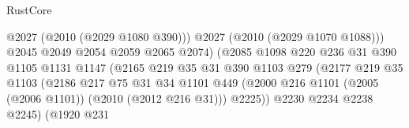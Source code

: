 \begin{lexlean}{RustCore}
\begin{coremodule}
                                                @2027
                                                (@2010 (@2029 @1080 @390)))
                                              @2027
                                              (@2010 (@2029 @1070 @1088)))
                                            @2045
                                            @2049
                                            @2054
                                            @2059
                                            @2065
                                            @2074)
                                          (@2085
                                            @1098
                                            @220
                                            @236
                                            @31
                                            @390
                                            @1105
                                            @1131
                                            @1147
                                            (@2165
                                              @219
                                              @35
                                              @31
                                              @390
                                              @1103
                                              @279
                                              (@2177
                                                @219
                                                @35
                                                @1103
                                                (@2186
                                                  @217
                                                  @75
                                                  @31
                                                  @34
                                                  @1101
                                                  @449
                                                  (@2000
                                                    @216
                                                    @1101
                                                    (@2005 (@2006 @1101))
                                                    (@2010 (@2012 @216 @31)))
                                                  @2225))
                                              @2230
                                              @2234
                                              @2238
                                              @2245)
                                            (@1920
                                              @231

\end{coremodule}
\end{lexlean}
